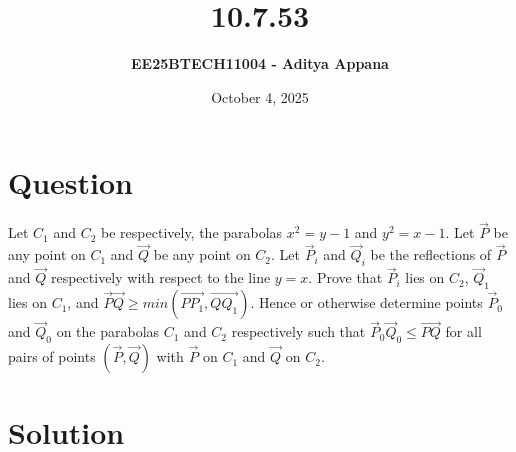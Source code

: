 \documentclass[12pt]{article}
\title{\textbf{10.7.53}}
\author{\textbf{EE25BTECH11004 - Aditya Appana}}
\date{October 4, 2025}
\begin{document}
\maketitle

\section*{Question}
Let $C_1$ and $C_2$ be respectively, the parabolas $x^2 = y- 1$ and $y^2 = x - 1$. Let $\vec{P}$ be any
point on $C_1$ and $\vec{Q}$ be any point on $C_2$. Let $\vec{P}_i$ and $\vec{Q}_i$ be the reflections of $\vec{P}$ and $\vec{Q}$
respectively with respect to the line $y = x$. Prove that $\vec{P}_i$ lies on $C_2$, $\vec{Q}_1$ lies on $C_1$,
and $\vec{P}\vec{Q} \geq min(\vec{PP_1}, \vec{QQ_1})$. Hence or otherwise determine points $\vec{P}_0$ and $\vec{Q}_0$  on the parabolas $C_1$ and $C_2$ respectively such that $\vec{P}_0\vec{Q}_0 \leq \vec{PQ}$ for all pairs of points $(\vec{P}, \vec{Q})$
with $\vec{P}$ on $C_1$ and $\vec{Q}$ on $C_2$.
\section*{Solution}
\end{document}
